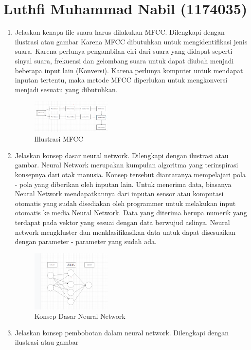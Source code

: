 \section{Luthfi Muhammad Nabil (1174035)}
\begin{enumerate}
\item Jelaskan kenapa file suara harus dilakukan MFCC. Dilengkapi dengan ilustrasi atau gambar
Karena MFCC dibutuhkan untuk mengidentifikasi jenis suara. Karena perlunya pengambilan ciri dari suara yang didapat seperti sinyal suara, frekuensi dan gelombang suara untuk dapat diubah menjadi beberapa input lain (Konversi). Karena perlunya komputer untuk mendapat inputan tertentu, maka metode MFCC diperlukan untuk mengkonversi menjadi sesuatu yang dibutuhkan. 
\begin{figure}[H]
    \includegraphics[width=4cm]{figures/1174035/chapter6/teori_1.png}
    \centering
    \caption{Illustrasi MFCC}
\end{figure}
\item Jelaskan konsep dasar neural network. Dilengkapi dengan ilustrasi atau gambar.
Neural Network merupakan kumpulan algoritma yang terinspirasi konsepnya dari otak manusia. Konsep tersebut diantaranya mempelajari pola - pola yang diberikan oleh inputan lain. Untuk menerima data, biasanya Neural Network mendapatkannya dari inputan sensor atau komputasi otomatis yang sudah disediakan oleh programmer untuk melakukan input otomatis ke media Neural Network. Data yang diterima berupa numerik yang terdapat pada vektor yang sesuai dengan data berwujud aslinya. Neural network mengkluster dan menklasifikasikan data untuk dapat disesuaikan dengan parameter - parameter yang sudah ada. 
\begin{figure}[H]
    \includegraphics[width=4cm]{figures/1174035/chapter6/teori_2.png}
    \centering
    \caption{Konsep Dasar Neural Network}
\end{figure}
\item Jelaskan konsep pembobotan dalam neural network. Dilengkapi dengan ilustrasi atau gambar

\end{enumerate}
